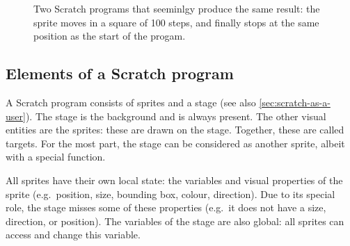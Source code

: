 \documentclass[../main]{subfiles}
\begin{document}
\begin{figure}
    \centering
    \begin{subfigure}{0.45\textwidth}
        \centering
        \begin{scratch}[scale=0.7]
        \end{scratch}
    \end{subfigure}
    \begin{subfigure}{0.45\textwidth}
        \centering
        \begin{scratch}[scale=0.7]
        \end{scratch}
    \end{subfigure}
    \caption{Two Scratch programs that seeminlgy produce the same result: the sprite moves in a square of 100 steps, and finally stops at the same position as the start of the progam.}\label{fig:scratch-two-programs}
\end{figure}

\subsection{Elements of a Scratch program}\label{subsec:elements-of-a-scratch-program}

A Scratch program consists of sprites and a stage (see also \vref{sec:scratch-as-a-user}).
The stage is the background and is always present.
The other visual entities are the sprites: these are drawn on the stage.
Together, these are called targets.
For the most part, the stage can be considered as another sprite, albeit with a special function.

All sprites have their own local state: the variables and visual properties of the sprite (e.g.\ position, size, bounding box, colour, direction).
Due to its special role, the stage misses some of these properties (e.g.\ it does not have a size, direction, or position).
The variables of the stage are also global: all sprites can access and change this variable.
\end{document}
